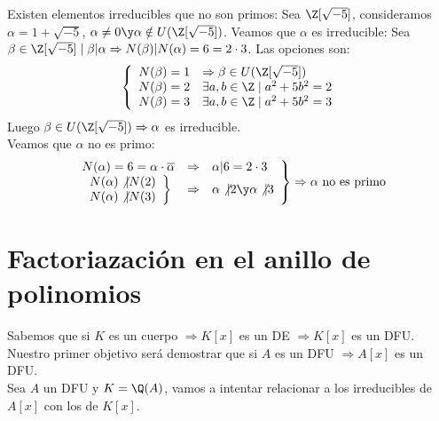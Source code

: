 \begin{ejemplo}
    Existen elementos irreducibles que no son primos:\newline
    Sea $\Z[\sqrt{-5}]$, consideramos $\alpha = 1+\sqrt{-5}$, $\alpha \neq 0 \y \alpha \notin U(\Z[\sqrt{-5}])$. Veamos
    que $\alpha$ es irreducible:\newline
    Sea $\beta \in \Z[\sqrt{-5}] \mid \beta|\alpha \Rightarrow N(\beta)|N(\alpha)=6=2\cdot 3$. Las opciones son:
    $$\left\{ \begin{array}{ll}
            N(\beta) = 1 & \Rightarrow \beta \in U(\Z[\sqrt{-5}]) \\
            N(\beta) = 2 & \exists a,b \in \Z \mid a^2+5b^2 = 2   \\
            N(\beta) = 3 & \exists a,b \in \Z \mid a^2+5b^2 = 3
        \end{array} \right.$$
    Luego $\beta \in U(\Z[\sqrt{-5}]) \Rightarrow \alpha$ es irreducible.\\

    
    Veamos que $\alpha$ no es primo:
    $$\left. \begin{array}{lll}
            N(\alpha) = 6 = \alpha \cdot \overline{\alpha} & \Rightarrow & \alpha|6 = 2 \cdot 3               \\
            \left. \begin{array}{l}
                       N(\alpha)\not|N(2) \\
                       N(\alpha)\not|N(3)
                   \end{array} \right\}                        & \Rightarrow & \alpha\not| 2 \y \alpha\not| 3
        \end{array} \right\} \Rightarrow \alpha \mbox{ no es primo}$$
\end{ejemplo}

\newpage
\section{Factoriazación en el anillo de polinomios}
Sabemos que si $K$ es un cuerpo $\Rightarrow K[x]$ es un DE $\Rightarrow K[x]$ es un DFU.\newline
Nuestro primer objetivo será demostrar que si $A$ es un DFU $\Rightarrow A[x]$ es un DFU.\\


Sea $A$ un DFU y $K = \Q(A)$, vamos a intentar relacionar a los irreducibles de $A[x]$ con los de $K[x]$.

